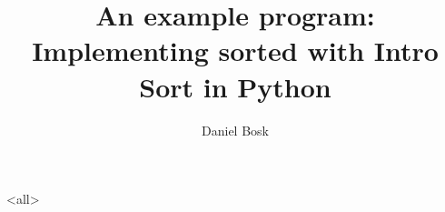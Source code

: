 \documentclass[ignoreframetext]{beamer}
\begin{document}
\title{%
  An example program:
  Implementing sorted with Intro Sort in Python
}
\author{%
  Daniel Bosk
}


\begin{frame}
  \maketitle
\end{frame}

\begin{abstract}
  
\end{abstract}

\clearpage

\begin{frame}
\end{frame}

\clearpage

\mode<all>

\mode*
\end{document}
